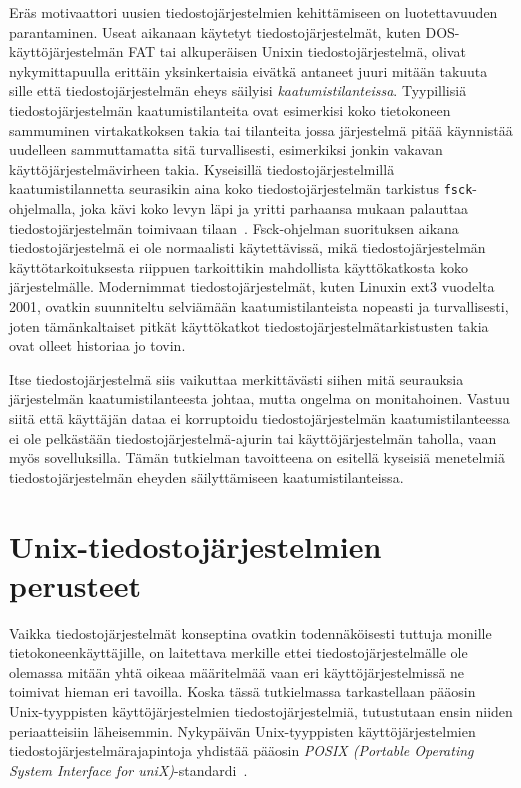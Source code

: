 Eräs motivaattori uusien tiedostojärjestelmien kehittämiseen on luotettavuuden parantaminen.
Useat aikanaan käytetyt tiedostojärjestelmät,
kuten DOS-käyttöjärjestelmän FAT tai alkuperäisen Unixin tiedostojärjestelmä,
olivat nykymittapuulla erittäin yksinkertaisia eivätkä antaneet juuri mitään takuuta sille että tiedostojärjestelmän eheys säilyisi \emph{kaatumistilanteissa}.
Tyypillisiä tiedostojärjestelmän kaatumistilanteita ovat esimerkisi koko tietokoneen sammuminen virtakatkoksen takia tai
tilanteita jossa järjestelmä pitää käynnistää uudelleen sammuttamatta sitä turvallisesti,
esimerkiksi jonkin vakavan käyttöjärjestelmävirheen takia.
Kyseisillä tiedostojärjestelmillä kaatumistilannetta seurasikin aina koko tiedostojärjestelmän tarkistus \texttt{fsck}-ohjelmalla,
joka kävi koko levyn läpi ja yritti parhaansa mukaan palauttaa tiedostojärjestelmän toimivaan tilaan~\cite{Ext2Journal}.
Fsck-ohjelman suorituksen aikana tiedostojärjestelmä ei ole normaalisti käytettävissä,
mikä tiedostojärjestelmän käyttötarkoituksesta riippuen tarkoittikin mahdollista käyttökatkosta koko järjestelmälle.
Modernimmat tiedostojärjestelmät, kuten Linuxin ext3 vuodelta 2001, ovatkin suunniteltu selviämään kaatumistilanteista nopeasti ja turvallisesti,
joten tämänkaltaiset pitkät käyttökatkot tiedostojärjestelmätarkistusten takia ovat olleet historiaa jo tovin.

Itse tiedostojärjestelmä siis vaikuttaa merkittävästi siihen mitä seurauksia järjestelmän kaatumistilanteesta johtaa, mutta ongelma on monitahoinen.
Vastuu siitä että käyttäjän dataa ei korruptoidu tiedostojärjestelmän kaatumistilanteessa ei ole pelkästään tiedostojärjestelmä-ajurin tai käyttöjärjestelmän taholla,
vaan myös sovelluksilla.
Tämän tutkielman tavoitteena on esitellä kyseisiä menetelmiä tiedostojärjestelmän eheyden säilyttämiseen kaatumistilanteissa.

\section{Unix-tiedostojärjestelmien perusteet}

Vaikka tiedostojärjestelmät konseptina ovatkin todennäköisesti tuttuja monille tietokoneenkäyttäjille,
on laitettava merkille ettei tiedostojärjestelmälle ole olemassa mitään yhtä oikeaa määritelmää
vaan eri käyttöjärjestelmissä ne toimivat hieman eri tavoilla.
Koska tässä tutkielmassa tarkastellaan pääosin Unix-tyyppisten käyttöjärjestelmien tiedostojärjestelmiä,
tutustutaan ensin niiden periaatteisiin läheisemmin.
Nykypäivän Unix-tyyppisten käyttöjärjestelmien tiedostojärjestelmärajapintoja yhdistää pääosin \emph{POSIX (Portable Operating System Interface for uniX)}-standardi~\cite{PosixSpec}.

